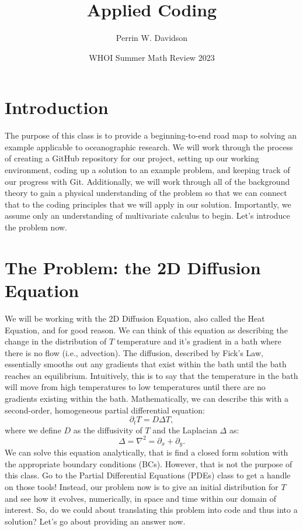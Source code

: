 \documentclass[11pt]{article}
\begin{document}
\title{Applied Coding}

\author{Perrin W. Davidson}

\date{WHOI Summer Math Review 2023}

\maketitle

\section*{Introduction}

The purpose of this class is to provide a beginning-to-end road map to solving an example applicable to oceanographic research.
We will work through the process of creating a GitHub repository for our project, setting up our working environment, coding up a solution to an example problem, and keeping track of our progress with Git. 
Additionally, we will work through all of the background theory to gain a physical understanding of the problem so that we can connect that to the coding principles that we will apply in our solution.
Importantly, we assume only an understanding of multivariate calculus to begin.
Let's introduce the problem now.

\section*{The Problem: the 2D Diffusion Equation}

We will be working with the 2D Diffusion Equation, also called the Heat Equation, and for good reason.
We can think of this equation as describing the change in the distribution of $T$ temperature and it's gradient in a bath where there is no flow (i.e., advection).
The diffusion, described by Fick's Law, essentially smooths out any gradients that exist within the bath until the bath reaches an equilibrium.
Intuitively, this is to say that the temperature in the bath will move from high temperatures to low temperatures until there are no gradients existing within the bath.
Mathematically, we can describe this with a second-order, homogeneous partial differential equation:
\begin{equation}
	\partial_t T = D\Delta T,
	\label{eq:diffusion}
\end{equation}
where we define $D$ as the diffusivity of  $T$ and the Laplacian $\Delta$ as:
\begin{equation}
	\Delta = \nabla ^2 = \partial_x + \partial_y.
\end{equation}
We can solve this equation analytically, that is find a closed form solution with the appropriate boundary conditions (BCs).
However, that is not the purpose of this class.
Go to the Partial Differential Equations (PDEs) class to get a handle on those tools!
Instead, our problem now is to give an initial distribution for $T$ and see how it evolves, numerically, in space and time within our domain of interest.
So, do we could about translating this problem into code and thus into a solution? 
Let's go about providing an answer now. 
\end{document}
